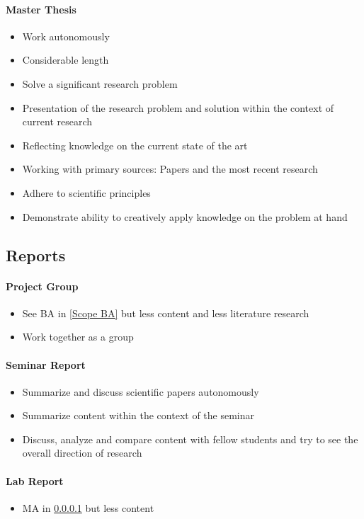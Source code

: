 \documentclass[nodate]{proc}
\begin{document}
\paragraph{Master Thesis} \label{Scope MA}
\begin{itemize}
	\item Work autonomously
	\item Considerable length
	\item Solve a significant research problem
	\item Presentation of the research problem and solution within the context of current research
	\item Reflecting knowledge on the current state of the art
	\item Working with primary sources: Papers and the most recent research
	\item Adhere to scientific principles
	\item Demonstrate ability to creatively apply knowledge on the problem at hand
\end{itemize}

\subsection{Reports}

\paragraph{Project Group}
	\begin{itemize}
		\item See BA in \ref{Scope BA} but less content and less literature research
		\item Work together as a group
	\end{itemize}
\paragraph{Seminar Report}
	\begin{itemize}
		\item Summarize and discuss scientific papers autonomously
		\item Summarize content within the context of the seminar
		\item Discuss, analyze and compare content with fellow students and try to see the overall direction of research
	\end{itemize}
\paragraph{Lab Report}
	\begin{itemize}
		\item  MA in \ref{Scope MA} but less content
	\end{itemize}
\end{document}
